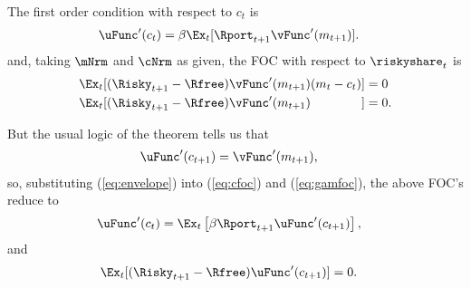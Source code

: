 \documentclass{\econtex}
\begin{document}
The first order condition with respect to $c_{t}$ is
\begin{equation}\begin{gathered}\begin{aligned}
      \uFunc^{\prime}(c_{t}) & =  \beta \Ex_{t}[ \Rport_{t+1}\vFunc^{\prime}({m}_{t+1})] \label{eq:cfoc}.
    \end{aligned}\end{gathered}\end{equation}
and, taking $\mNrm$ and $\cNrm$ as given, the FOC with respect to $\riskyshare_{t}$ is
\begin{equation}\begin{gathered}\begin{aligned}
      \Ex_{t}[(\Risky_{t+1}-\Rfree)\vFunc^{\prime}({m}_{t+1})({m}_{t}-{c}_{t})] & =  0 
      \\      \Ex_{t}[(\Risky_{t+1}-\Rfree)\vFunc^{\prime}({m}_{t+1})\phantom{({m}_{t}-{c}_{t})}] & =  0 \label{eq:gamfoc}
      .
    \end{aligned}\end{gathered}\end{equation}

But the usual logic of the  theorem tells us that 
\begin{equation}\begin{gathered}\begin{aligned}
      \uFunc^{\prime}(c_{t+1}) & =  \vFunc^{\prime}(m_{t+1}), \label{eq:envelope}
    \end{aligned}\end{gathered}\end{equation}
so, substituting (\ref{eq:envelope}) into (\ref{eq:cfoc}) and (\ref{eq:gamfoc}), the above FOC's reduce to
\begin{equation}\begin{gathered}\begin{aligned}
      \uFunc^{\prime}(c_{t}) & =  \Ex_{t}\left[\beta  \Rport_{t+1} \uFunc^{\prime}({c}_{t+1})\right] \label{eq:ceuler},
    \end{aligned}\end{gathered}\end{equation}
and
\begin{equation}\begin{gathered}\begin{aligned}
      \Ex_{t}[(\Risky_{t+1}-\Rfree)\uFunc^{\prime}({c}_{t+1})] & =  0 \label{eq:ShareEuler}.
\end{aligned}\end{gathered}\end{equation}
\end{document}
